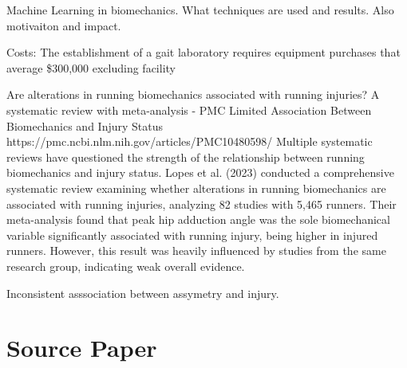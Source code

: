 \cite{Harris2022} Machine Learning in biomechanics. What techniques are used and results. Also motivaiton and impact.

\citep{Simon2004}
Costs: The establishment of a gait laboratory requires equipment purchases that average \$300,000 excluding facility

Are alterations in running biomechanics associated with running injuries? A systematic review with meta-analysis - PMC
Limited Association Between Biomechanics and Injury Status
https://pmc.ncbi.nlm.nih.gov/articles/PMC10480598/
Multiple systematic reviews have questioned the strength of the relationship between running biomechanics and injury status. Lopes et al. (2023) conducted a comprehensive systematic review examining whether alterations in running biomechanics are associated with running injuries, analyzing 82 studies with 5,465 runners. Their meta-analysis found that peak hip adduction angle was the sole biomechanical variable significantly associated with running injury, being higher in injured runners. However, this result was heavily influenced by studies from the same research group, indicating weak overall evidence.


Inconsistent asssociation between assymetry and injury. \citep{Guan2022}


\section{Source Paper}\label{sec:sota-source-paper}

